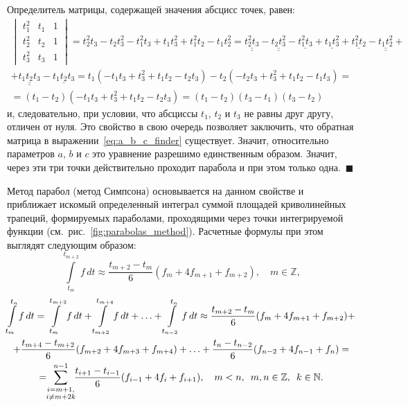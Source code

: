 \documentclass[12pt,a4paper,openany]{extarticle}
\begin{document}
Определитель матрицы, содержащей значения абсцисс точек, равен:
\begin{multline}
\begin{vmatrix}
t_1^2 & t_1 & 1\\
t_2^2 & t_2 & 1\\
t_3^2 & t_3 & 1
\end{vmatrix} = t_2^2 t_3 - t_2 t_3^2 - t_1^2 t_3 + t_1 t_3^2 + t_1^2 t_2 - t_1 t_2^2 = \underline{\underline{t_2^2 t_3}} - \underline{\underline{t_2 t_3^2}} - \underline{t_1^2 t_3} + \underline{t_1 t_3^2} + \underline{t_1^2 t_2} - \underline{\underline{t_1 t_2^2}} +\\
%
+\underline{\underline{t_1 t_2 t_3}} - \underline{t_1 t_2 t_3}  = t_1(-t_1 t_3 + t_3^2 + t_1 t_2 - t_2 t_3) - t_2(-t_2 t_3 + t_3^2 + t_1 t_2 -t_1 t_3) = \\
%
= (t_1-t_2)(-t_1 t_3 + t_3^2 + t_1 t_2 - t_2 t_3) = (t_1 - t_2)(t_3 - t_1)(t_3 - t_2)
\end{multline}
и, следовательно, при условии, что абсциссы $t_1$, $t_2$ и $t_3$ не равны друг другу, отличен от нуля.
Это свойство в свою очередь позволяет заключить, что обратная матрица в выражении~\eqref{eq:a_b_c_finder} существует.
Значит, относительно параметров $a$, $b$ и $c$ это уравнение разрешимо единственным образом.
Значит, через эти три точки действительно проходит парабола и при этом только одна.~$\blacksquare$

Метод парабол (метод Симпсона) основывается на данном свойстве и приближает искомый определенный интеграл суммой площадей криволинейных трапеций, формируемых параболами, проходящими через точки интегрируемой функции (см.~рис.~\ref{fig:parabolas_method}).
Расчетные формулы при этом выглядят следующим образом:
\begin{equation}\label{eq:square_of_1_parabola}
\int\limits_{t_m}^{t_{m+2}} f\,dt \approx \dfrac{t_{m+2} - t_{m}}{6}(f_m + 4f_{m+1} + f_{m+2}), \quad m\in\mathbb{Z},
\end{equation}
\vspace{-0.5cm}
\begin{multline}
\int\limits_{t_m}^{t_{n}} f\,dt = \int\limits_{t_m}^{t_{m+2}} f\,dt + \int\limits_{t_{m+2}}^{t_{m+4}} f\,dt + \ldots + \int\limits_{t_{n-2}}^{t_{n}} f\,dt \approx \dfrac{t_{m+2} - t_{m}}{6}(f_m + 4f_{m+1} + f_{m+2}) +\\
%
+ \dfrac{t_{m+4} - t_{m+2}}{6}(f_{m+2} + 4f_{m+3} + f_{m+4}) + \ldots + \dfrac{t_{n} - t_{n-2}}{6}(f_{n-2} + 4f_{n-1} + f_{n}) =\\
%
=\!\! \sum\limits_{\substack{i = m+1,\\i\ne m+2k}}^{n-1}\!\!\dfrac{t_{i+1} - t_{i-1}}{6}(f_{i-1} + 4f_{i} + f_{i+1}), \quad m<n, \;\: m,n\in\mathbb{Z}, \:\; k\in\mathbb{N}\ldotp
\end{multline}
\end{document}
